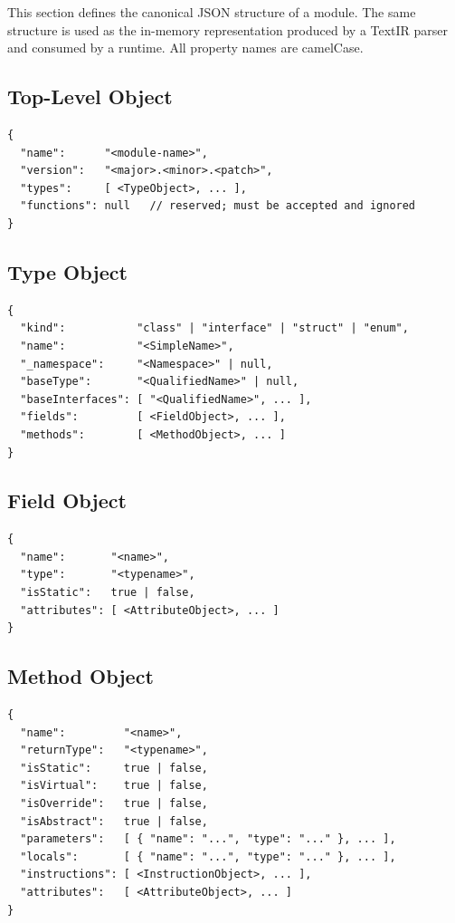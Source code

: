 \documentclass[11pt,a4paper]{article}
\begin{document}
This section defines the canonical JSON structure of a module. The same
structure is used as the in-memory representation produced by a TextIR
parser and consumed by a runtime. All property names are camelCase.

\subsection{Top-Level Object}

\begin{lstlisting}[style=json]
{
  "name":      "<module-name>",
  "version":   "<major>.<minor>.<patch>",
  "types":     [ <TypeObject>, ... ],
  "functions": null   // reserved; must be accepted and ignored
}
\end{lstlisting}

\subsection{Type Object}

\begin{lstlisting}[style=json]
{
  "kind":           "class" | "interface" | "struct" | "enum",
  "name":           "<SimpleName>",
  "_namespace":     "<Namespace>" | null,
  "baseType":       "<QualifiedName>" | null,
  "baseInterfaces": [ "<QualifiedName>", ... ],
  "fields":         [ <FieldObject>, ... ],
  "methods":        [ <MethodObject>, ... ]
}
\end{lstlisting}

\subsection{Field Object}

\begin{lstlisting}[style=json]
{
  "name":       "<name>",
  "type":       "<typename>",
  "isStatic":   true | false,
  "attributes": [ <AttributeObject>, ... ]
}
\end{lstlisting}

\subsection{Method Object}

\begin{lstlisting}[style=json]
{
  "name":         "<name>",
  "returnType":   "<typename>",
  "isStatic":     true | false,
  "isVirtual":    true | false,
  "isOverride":   true | false,
  "isAbstract":   true | false,
  "parameters":   [ { "name": "...", "type": "..." }, ... ],
  "locals":       [ { "name": "...", "type": "..." }, ... ],
  "instructions": [ <InstructionObject>, ... ],
  "attributes":   [ <AttributeObject>, ... ]
}
\end{lstlisting}
\end{document}
